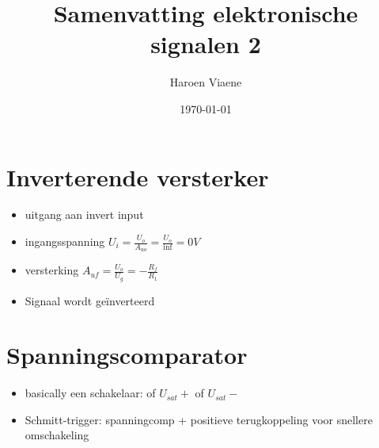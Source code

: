 \documentclass[11pt]{article}
\title{Samenvatting elektronische signalen 2}
\author{Haroen Viaene}
\date{\today}
\let\originalitem\item
\renewcommand{\item}{\originalitem[]}
\newcommand{\Newpage}{\end{preview}\begin{preview}}
\begin{document}
\begin{preview}

\maketitle

\tableofcontents

\Newpage

\section{Inverterende versterker}

\begin{itemize}
  \item uitgang aan invert input
  \item ingangsspanning $ U_i = \frac{U_o}{A_{uo}} = \frac{U_o}{\inf} = 0V $
  \item versterking $ A_{uf} = \frac{U_o}{U_g} = -\frac{R_f}{R_1} $
  \item Signaal wordt geïnverteerd
\end{itemize}

\section{Spanningscomparator}

\begin{itemize}
  \item basically een schakelaar: of $ U_{sat}+ $ of $ U_{sat}- $
  \item Schmitt-trigger: spanningcomp + positieve terugkoppeling voor snellere omschakeling
\end{itemize}


\end{preview}
\end{document}
